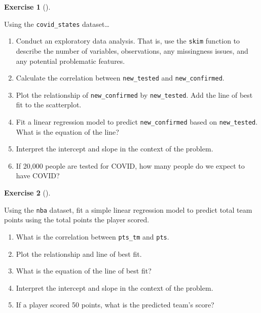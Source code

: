 \documentclass[
  letterpaper,
  DIV=11,
  numbers=noendperiod]{scrreprt}
\providecommand{\tightlist}{%
  \setlength{\itemsep}{0pt}\setlength{\parskip}{0pt}}\usepackage{longtable,booktabs,array}
\theoremstyle{definition}
\newtheorem{exercise}{Exercise}[chapter]
\theoremstyle{remark}
\begin{document}
\leavevmode{}%
\begin{exercise}[]\label{exr-ch05-app1}

Using the \texttt{covid\_states} dataset\ldots{}

\begin{enumerate}
\def\labelenumi{\alph{enumi})}
\tightlist
\item
  Conduct an exploratory data analysis. That is, use the \texttt{skim}
  function to describe the number of variables, observations, any
  missingness issues, and any potential problematic features.
\item
  Calculate the correlation between \texttt{new\_tested} and
  \texttt{new\_confirmed}.
\item
  Plot the relationship of \texttt{new\_confirmed} by
  \texttt{new\_tested}. Add the line of best fit to the scatterplot.
\item
  Fit a linear regression model to predict \texttt{new\_confirmed} based
  on \texttt{new\_tested}. What is the equation of the line?
\item
  Interpret the intercept and slope in the context of the problem.
\item
  If 20,000 people are tested for COVID, how many people do we expect to
  have COVID?
\end{enumerate}

\end{exercise}

\leavevmode{}%
\begin{exercise}[]\label{exr-ch05-app2}

Using the \texttt{nba} dataset, fit a simple linear regression model to
predict total team points using the total points the player scored.

\begin{enumerate}
\def\labelenumi{\alph{enumi})}
\tightlist
\item
  What is the correlation between \texttt{pts\_tm} and \texttt{pts}.
\item
  Plot the relationship and line of best fit.
\item
  What is the equation of the line of best fit?
\item
  Interpret the intercept and slope in the context of the problem.
\item
  If a player scored 50 points, what is the predicted team's score?
\end{enumerate}

\end{exercise}
\end{document}

